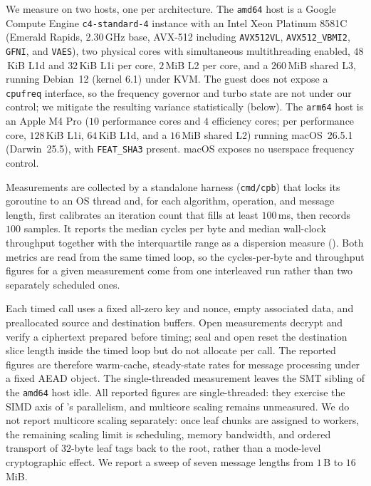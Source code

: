 We measure on two hosts, one per architecture. The \texttt{amd64} host is a
Google Compute Engine \texttt{c4-standard-4} instance with an Intel Xeon Platinum
8581C (Emerald Rapids, $2.30$\,GHz base, AVX-512 including \texttt{AVX512VL},
\texttt{AVX512\_VBMI2}, \texttt{GFNI}, and \texttt{VAES}), two physical cores
with simultaneous multithreading enabled, $48$\,KiB L1d and $32$\,KiB L1i per
core, $2$\,MiB L2 per core, and a $260$\,MiB shared L3, running Debian~12 (kernel
6.1) under KVM. The guest does not expose a \texttt{cpufreq} interface, so the
frequency governor and turbo state are not under our control; we mitigate the
resulting variance statistically (below). The \texttt{arm64} host is an Apple M4
Pro ($10$ performance cores and $4$ efficiency cores; per performance core,
$128$\,KiB L1i, $64$\,KiB L1d, and a $16$\,MiB shared L2) running macOS~26.5.1
(Darwin~25.5), with \texttt{FEAT\_SHA3} present. macOS exposes no userspace
frequency control.

Measurements are collected by a standalone harness (\texttt{cmd/cpb}) that locks
its goroutine to an OS thread and, for each algorithm, operation, and message
length, first calibrates an iteration count that fills at least $100$\,ms, then
records $100$ samples. It reports the median cycles per byte and median
wall-clock throughput together with the interquartile range as a dispersion
measure (). Both metrics are read from the same timed
loop, so the cycles-per-byte and throughput figures for a given measurement
come from one interleaved run rather than two separately scheduled ones.

Each timed call uses a fixed all-zero key and nonce, empty associated data, and
preallocated source and destination buffers. Open measurements decrypt and
verify a ciphertext prepared before timing; seal and open reset the destination
slice length inside the timed loop but do not allocate per call. The reported
figures are therefore warm-cache, steady-state rates for message processing
under a fixed AEAD object. The single-threaded measurement leaves the SMT
sibling of the \texttt{amd64} host idle. All reported figures are
single-threaded: they exercise the SIMD axis of \TW{}'s parallelism, and
multicore scaling remains unmeasured. We do not report multicore scaling
separately: once leaf chunks are assigned to workers, the remaining scaling
limit is scheduling, memory bandwidth, and ordered transport of $32$-byte leaf
tags back to the root, rather than a mode-level cryptographic effect. We report
a sweep of seven message lengths from $1$\,B to $16$\,MiB.

